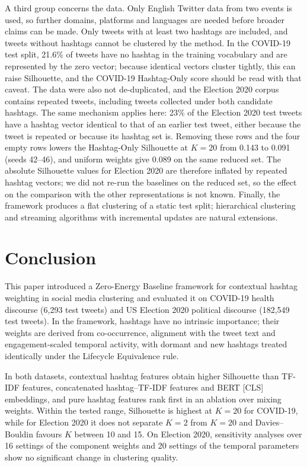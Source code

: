 \documentclass[pdflatex,sn-mathphys-num]{sn-jnl}%
\begin{document}
A third group concerns the data. Only English Twitter data from two events is used, so further domains, platforms and languages are needed before broader claims can be made. Only tweets with at least two hashtags are included, and tweets without hashtags cannot be clustered by the method. In the COVID-19 test split, 21.6\% of tweets have no hashtag in the training vocabulary and are represented by the zero vector; because identical vectors cluster tightly, this can raise Silhouette, and the COVID-19 Hashtag-Only score should be read with that caveat. The data were also not de-duplicated, and the Election 2020 corpus contains repeated tweets, including tweets collected under both candidate hashtags. The same mechanism applies here: 23\% of the Election 2020 test tweets have a hashtag vector identical to that of an earlier test tweet, either because the tweet is repeated or because its hashtag set is. Removing these rows and the four empty rows lowers the Hashtag-Only Silhouette at $K=20$ from 0.143 to 0.091 (seeds 42--46), and uniform weights give 0.089 on the same reduced set. The absolute Silhouette values for Election 2020 are therefore inflated by repeated hashtag vectors; we did not re-run the baselines on the reduced set, so the effect on the comparison with the other representations is not known. Finally, the framework produces a flat clustering of a static test split; hierarchical clustering and streaming algorithms with incremental updates are natural extensions.


\section{Conclusion}\label{sec7}

This paper introduced a Zero-Energy Baseline framework for contextual hashtag weighting in social media clustering and evaluated it on COVID-19 health discourse (6,293 test tweets) and US Election 2020 political discourse (182,549 test tweets). In the framework, hashtags have no intrinsic importance; their weights are derived from co-occurrence, alignment with the tweet text and engagement-scaled temporal activity, with dormant and new hashtags treated identically under the Lifecycle Equivalence rule.

In both datasets, contextual hashtag features obtain higher Silhouette than TF-IDF features, concatenated hashtag--TF-IDF features and BERT [CLS] embeddings, and pure hashtag features rank first in an ablation over mixing weights. Within the tested range, Silhouette is highest at $K=20$ for COVID-19, while for Election 2020 it does not separate $K=2$ from $K=20$ and Davies--Bouldin favours $K$ between 10 and 15. On Election 2020, sensitivity analyses over 16 settings of the component weights and 20 settings of the temporal parameters show no significant change in clustering quality.
\end{document}
